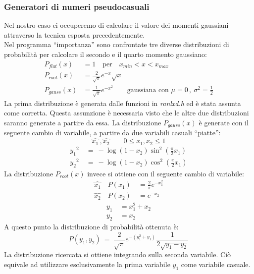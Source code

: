 \subsubsection{Generatori di numeri pseudocasuali}
Nel nostro caso ci occuperemo di calcolare il valore dei momenti gaussiani attraverso la tecnica esposta precedentemente. \\
Nel programma ``importanza'' sono confrontate tre diverse distribuzioni di probabilità per calcolare il secondo e il quarto momento gaussiano:
\begin{align*}
\nonumber
P_{flat}(x) &= 1 \quad \mbox{per} \quad x_{min} < x < x_{max}\\
\nonumber
P_{root}(x) &= \frac{2}{\sqrt{\pi}} e^{-x} \sqrt{x}\\
\nonumber
P_{gauss}(x) &= \frac{1}{\sqrt{\pi}} e^{-x^2} \qquad \mbox{gaussiana con } \mu = 0 \, , \ \sigma^2 = \tfrac{1}{2}
\end{align*}
La prima distribuzione è generata dalle funzioni in \emph{ranlxd.h} ed è stata assunta come corretta. Questa assunzione è necessaria visto che le altre
due distribuzioni saranno generate a partire da essa. La distribuzione $P_{gauss}(x)$ è generate con il seguente cambio di variabile, a partire
da due variabili casuali ``piatte'':
$$
\hat{x_1} \, , \hat{x_2} \qquad 0 \leq x_1 , x_2 \leq 1
$$
\begin{align*}
 \nonumber
 {y_1}^2 \ &= \ - \log(1-x_2) \sin^2\left(\frac{\pi}{2} x_1 \right) \\ 
 \nonumber
 {y_2}^2 \ &= \ - \log(1-x_2) \cos^2\left(\frac{\pi}{2}x_1 \right) 
\end{align*}
La distribuzione $P_{root}(x)$ invece si ottiene con il seguente cambio di variabile:
\begin{align*}
 \nonumber
 \hat{x_1} \quad P(x_1) \ &= \frac{2}{\pi} e^{-x_1^2} \\
 \hat{x_2} \quad P(x_2) \ &= e^{-x_2}
\end{align*}
\begin{align*}
 y_1 \ &= x_1^2 + x_2 \\
 y_2 &= x_2
\end{align*}
A questo punto la distribuzione di probabilità ottenuta è:
$$
P(y_1,y_2) \ = \ \frac{2}{\sqrt{\pi}} e^{-\left(y_1^2 + y_1\right)}\frac{1}{2\sqrt{y_1 -y_2}} 
$$
La distribuzione ricercata si ottiene integrando sulla seconda variabile. Ciò equivale ad utilizzare esclusivamente la prima variabile $y_1$
come variabile casuale.
